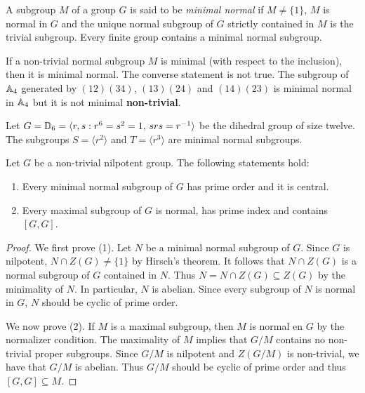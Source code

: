 A subgroup $M$ of a group $G$ is said to be {\em minimal normal} if $M\ne\{1\}$,
$M$ is normal in $G$ and the unique normal subgroup of $G$ strictly contained in $M$ is
the trivial subgroup. Every finite group contains a minimal normal subgroup.  

\begin{example}
	If a non-trivial normal subgroup $M$ is minimal (with respect to the inclusion), then it is
	minimal normal. The converse statement is not true. The subgroup of 
	$\mathbb{A}_4$ generated by $(12)(34)$, $(13)(24)$ and $(14)(23)$ is minimal normal in 
	$\mathbb{A}_4$ but it is not minimal {\bf non-trivial}. 
\end{example}

\begin{example}
	Let $G=\mathbb{D}_{6}=\langle r,s:r^6=s^2=1,\,srs=r^{-1}\rangle$ be the dihedral group
	of size twelve. The subgroups $S=\langle r^2\rangle$ 
	and $T=\langle r^3\rangle$ are minimal normal subgroups.
	\end{example}


\begin{theorem}\label{theorem:minmax_nilpotent}
	Let $G$ be a non-trivial nilpotent group. The following statements hold:
	\begin{enumerate}
		\item Every minimal normal subgroup of $G$ has prime order and it is central. 
		\item Every maximal subgroup of $G$ is normal, has prime index and contains $[G,G]$. 
	\end{enumerate}
\end{theorem}

\begin{proof}
	We first prove (1). Let $N$ be a minimal normal subgroup of $G$. Since $G$ is nilpotent, 
	$N\cap Z(G)\ne\{1\}$ by Hirsch's theorem. It follows that $N\cap Z(G)$ is a normal subgroup of $G$ contained in $N$. 
	Thus $N=N\cap Z(G)\subseteq
	Z(G)$ by the minimality of $N$. In particular, $N$ is abelian. Since 
	every subgroup of $N$ is normal in $G$, $N$ should be cyclic of prime order.

	We now prove (2). If $M$ is a maximal subgroup, then $M$
	is normal en $G$ by the normalizer condition. The maximality of $M$ implies that 
	$G/M$ contains no non-trivial proper subgroups.  Since $G/M$ is nilpotent and $Z(G/M)$ is non-trivial, we have that $G/M$ is abelian. Thus 
	$G/M$ should be cyclic of prime order and thus $[G,G]\subseteq M$. 
\end{proof}


